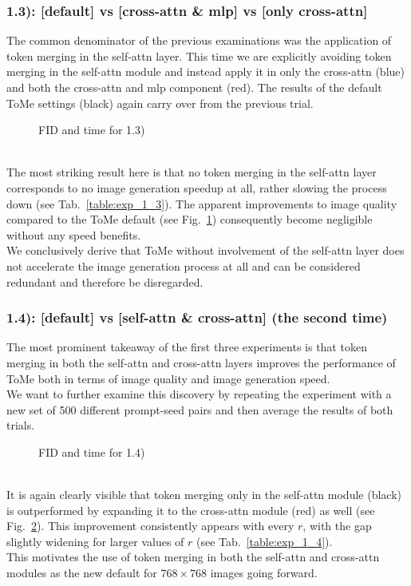 \subsubsection*{1.3): [default] vs [cross-attn \& mlp] vs [only cross-attn]}
The common denominator of the previous examinations was the application of token merging in the self-attn layer. This time we are explicitly avoiding token merging in the self-attn module and instead apply it in only the cross-attn (blue) and both the cross-attn and mlp component (red).
The results of the default ToMe settings (black) again carry over from the previous trial.\\
\begin{figure}[!htb]
    
    
\caption{FID and time for 1.3)}
\label{fig:exp_1_3}
\end{figure}\\
The most striking result here is that no token merging in the self-attn layer corresponds to no image generation speedup at all, rather slowing the process down (see Tab.~\ref{table:exp_1_3}). 
The apparent improvements to image quality compared to the ToMe default (see Fig.~\ref{fig:exp_1_3}) consequently become negligible without any speed benefits.\\
We conclusively derive that ToMe without involvement of the self-attn layer does not accelerate the image generation process at all and can be considered redundant and therefore be disregarded.




\subsubsection*{1.4): [default] vs [self-attn \& cross-attn] (the second time)}
The most prominent takeaway of the first three experiments is that token merging in both the self-attn and cross-attn layers improves the performance of ToMe both in terms of image quality and image generation speed.\\
We want to further examine this discovery by repeating the experiment with a new set of 500 different prompt-seed pairs and then average the results of both trials.
\begin{figure}[!htb]
    
    
\caption{FID and time for 1.4)}
\label{fig:exp_1_4}
\end{figure}\\
It is again clearly visible that token merging only in the self-attn module (black) is outperformed by expanding it to the cross-attn module (red) as well (see Fig.~\ref{fig:exp_1_4}). This improvement consistently appears with every \(r\), with the gap slightly widening for larger values of \(r\) (see Tab.~\ref{table:exp_1_4}).\\
This motivates the use of token merging in both the self-attn and cross-attn modules as the new default for $768 \times 768$ images going forward.



